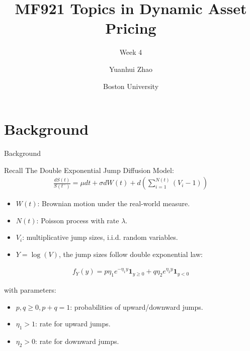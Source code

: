 \documentclass{beamer}
\title{MF921 Topics in Dynamic Asset Pricing}
\subtitle{Week 4}
\author{Yuanhui Zhao}
\date{Boston University}
\begin{document}
\frame{\titlepage}

\section{Background}
\begin{frame}{Background}

    {\footnotesize \footnotesize
    \par Recall The Double Exponential Jump Diffusion Model:
    \begin{align*}
        \frac{dS(t)}{S(t^{-})} = \mu dt + \sigma dW(t) + d\left(\sum_{i=1}^{N(t)} (V_i - 1)\right)
    \end{align*}
    \par\begin{itemize}
    \item \( W(t) \): Brownian motion under the real-world measure.
    \item \( N(t) \): Poisson process with rate \(\lambda\).
    \item \( V_i \): multiplicative jump sizes, i.i.d. random variables.
    \item \( Y = \log(V) \), the jump sizes follow double exponential law:
    \end{itemize}   
    \begin{align*}
        f_Y(y) = p \eta_1 e^{-\eta_1 y} \mathbf{1}_{y \geq 0} + q \eta_2 e^{\eta_2 y} \mathbf{1}_{y < 0}
    \end{align*}
    \par with parameters:
    \begin{itemize}
        \item \( p, q \geq 0, p + q = 1 \): probabilities of upward/downward jumps.
        \item \(\eta_1 > 1\): rate for upward jumps.
        \item \(\eta_2 > 0\): rate for downward jumps.
    \end{itemize}
    }
    
\end{frame}
\end{document}
